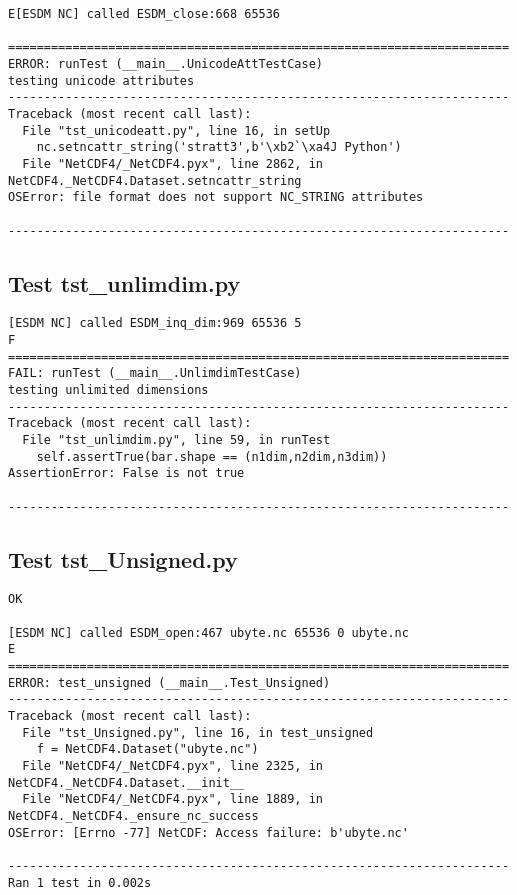 \begin{verbatim}
E[ESDM NC] called ESDM_close:668 65536

======================================================================
ERROR: runTest (__main__.UnicodeAttTestCase)
testing unicode attributes
----------------------------------------------------------------------
Traceback (most recent call last):
  File "tst_unicodeatt.py", line 16, in setUp
    nc.setncattr_string('stratt3',b'\xb2`\xa4J Python')
  File "NetCDF4/_NetCDF4.pyx", line 2862, in NetCDF4._NetCDF4.Dataset.setncattr_string
OSError: file format does not support NC_STRING attributes

----------------------------------------------------------------------
\end{verbatim}

\subsection{Test tst\_unlimdim.py}

\begin{verbatim}
[ESDM NC] called ESDM_inq_dim:969 65536 5
F
======================================================================
FAIL: runTest (__main__.UnlimdimTestCase)
testing unlimited dimensions
----------------------------------------------------------------------
Traceback (most recent call last):
  File "tst_unlimdim.py", line 59, in runTest
    self.assertTrue(bar.shape == (n1dim,n2dim,n3dim))
AssertionError: False is not true

----------------------------------------------------------------------
\end{verbatim}

\subsection{Test tst\_Unsigned.py}

\begin{verbatim}
OK

[ESDM NC] called ESDM_open:467 ubyte.nc 65536 0 ubyte.nc
E
======================================================================
ERROR: test_unsigned (__main__.Test_Unsigned)
----------------------------------------------------------------------
Traceback (most recent call last):
  File "tst_Unsigned.py", line 16, in test_unsigned
    f = NetCDF4.Dataset("ubyte.nc")
  File "NetCDF4/_NetCDF4.pyx", line 2325, in NetCDF4._NetCDF4.Dataset.__init__
  File "NetCDF4/_NetCDF4.pyx", line 1889, in NetCDF4._NetCDF4._ensure_nc_success
OSError: [Errno -77] NetCDF: Access failure: b'ubyte.nc'

----------------------------------------------------------------------
Ran 1 test in 0.002s
\end{verbatim}


